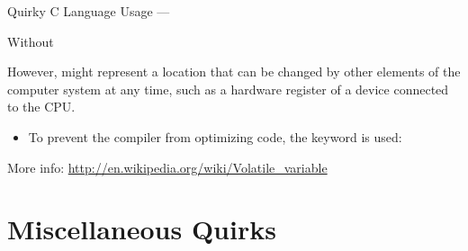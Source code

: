 \begin{frame}{Quirky C Language Usage}{ --- }
  \begin{minipage}{.44\linewidth}
    \begin{block}{Without }
       
    \end{block}
  \end{minipage}\hfill
  \begin{minipage}{.50\linewidth}
    However,  might represent a location that can be changed by other elements
    of the computer system at any time, such as a hardware register of a device connected
    to the CPU.
  \end{minipage}
  \begin{itemize}
  \item[] To prevent the compiler from optimizing code, the  keyword is
    used:
    \begin{center}
    \end{center}
  \end{itemize}
\end{frame}

More info: \url{http://en.wikipedia.org/wiki/Volatile_variable}

\section{Miscellaneous Quirks}
\label{sec:miscellaneous-quirks}

